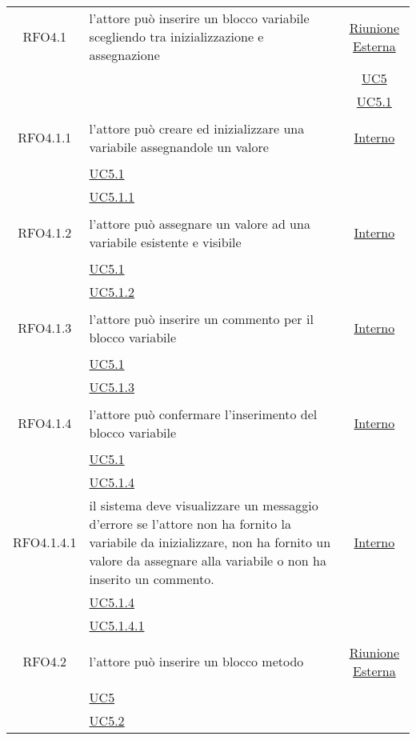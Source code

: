 \begin{longtable}{|c|>{\centering}m{7cm}|c|}
\hypertarget{RFO4.1}{RFO4.1} & l'attore può inserire un blocco variabile scegliendo tra inizializzazione e assegnazione &  \hyperlink{Riunione Esterna}{Riunione Esterna}\\
& &\hyperref[UC5]{UC5}\\
& &\hyperref[UC5.1]{UC5.1}\\ \hline

\hypertarget{RFO4.1.1}{RFO4.1.1} & l'attore può creare ed inizializzare una variabile assegnandole un valore & \hyperlink{Interno}{Interno}\\
& \hyperref[UC5.1]{UC5.1}\\
& \hyperref[UC5.1.1]{UC5.1.1}\\ \hline

\hypertarget{RFO4.1.2}{RFO4.1.2} & l'attore può assegnare un valore ad una variabile esistente e visibile & \hyperlink{Interno}{Interno}\\
& \hyperref[UC5.1]{UC5.1}\\
& \hyperref[UC5.1.2]{UC5.1.2}\\ \hline

\hypertarget{RFO4.1.3}{RFO4.1.3} & l’attore può inserire un commento per il blocco variabile & \hyperlink{Interno}{Interno}\\
& \hyperref[UC5.1]{UC5.1}\\
& \hyperref[UC5.1.3]{UC5.1.3}\\ \hline

\hypertarget{RFO4.1.4}{RFO4.1.4} & l’attore può confermare l'inserimento del blocco variabile &\hyperlink{Interno}{Interno}\\
& \hyperref[UC5.1]{UC5.1}\\
& \hyperref[UC5.1.4]{UC5.1.4}\\ \hline

\hypertarget{RFO4.1.4.1}{RFO4.1.4.1} & il sistema deve visualizzare un messaggio d’errore se l'attore non ha fornito la variabile da inizializzare, non ha fornito un valore da assegnare alla variabile o non ha inserito un commento. & \hyperlink{Interno}{Interno}\\
& \hyperref[UC5.1.4]{UC5.1.4}\\
& \hyperref[UC5.1.4.1]{UC5.1.4.1}\\ \hline

\hypertarget{RFO4.2}{RFO4.2} & l'attore può inserire un blocco metodo & \hyperlink{Riunione Esterna}{Riunione Esterna}\\
& \hyperref[UC5]{UC5}\\
& \hyperref[UC5.2]{UC5.2}\\ \hline


\end{longtable}

